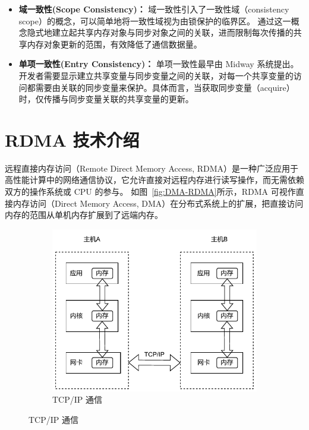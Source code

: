 {\begin{itemize}
        \item \textbf{域一致性(Scope Consistency)：} 域一致性引入了一致性域（consistency scope）的概念，可以简单地将一致性域视为由锁保护的临界区。
              通过这一概念隐式地建立起共享内存对象与同步对象之间的关联，进而限制每次传播的共享内存对象更新的范围，有效降低了通信数据量。

        \item \textbf{单项一致性(Entry Consistency)：} 单项一致性最早由 Midway 系统提出。开发者需要显示建立共享变量与同步变量之间的关联，对每一个共享变量的访问都需要由关联的同步变量来保护。具体而言，当获取同步变量（acquire）时，仅传播与同步变量关联的共享变量的更新。
    \end{itemize}

    \section{RDMA 技术介绍}\label{RDMA 技术介绍}
    远程直接内存访问（Remote Direct Memory Access, RDMA）是一种广泛应用于高性能计算中的网络通信协议，它允许直接对远程内存进行读写操作，而无需依赖双方的操作系统或 CPU 的参与。
    如图~\ref{fig:DMA-RDMA}所示，RDMA 可视作直接内存访问（Direct Memory Access, DMA）在分布式系统上的扩展，把直接访问内存的范围从单机内存扩展到了远端内存。
    \begin{figure}[!htbp]
        \centering
        \begin{subfigure}[b]{0.50\textwidth}
            \includegraphics[width=\textwidth]{Img/TCP_IP通信.drawio.pdf}
            \caption{TCP/IP 通信}
            \label{fig:TCPIP}
        \end{subfigure}%

\end{figure}}
